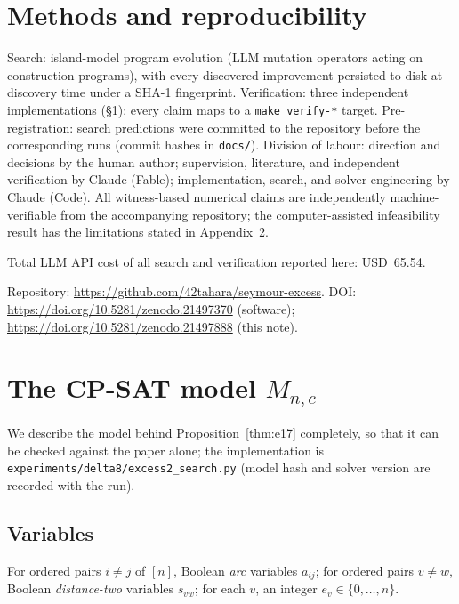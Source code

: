 \documentclass[11pt]{amsart}
\theoremstyle{remark}
\begin{document}
\section{Methods and reproducibility}

Search: island-model program evolution (LLM mutation operators acting on
construction programs), with every discovered improvement persisted to disk
at discovery time under a SHA-1 fingerprint.
Verification: three independent implementations (\S1); every
claim maps to a \texttt{make verify-*} target. Pre-registration: search
predictions were committed to the repository before the corresponding runs
(commit hashes in \texttt{docs/}). Division of labour: direction and
decisions by the human author; supervision, literature, and independent
verification by Claude (Fable); implementation, search, and solver
engineering by Claude (Code). All witness-based numerical claims are
independently machine-verifiable from the accompanying repository; the
computer-assisted infeasibility result has the limitations stated in
Appendix~\ref{app:model}.

Total LLM API cost of all search and verification reported here:
USD~65.54.

Repository: \url{https://github.com/42tahara/seymour-excess}.
DOI: \url{https://doi.org/10.5281/zenodo.21497370} (software);
\url{https://doi.org/10.5281/zenodo.21497888} (this note).


\appendix

\section{The CP-SAT model $M_{n,c}$}\label{app:model}

We describe the model behind Proposition~\ref{thm:e17} completely, so that
it can be checked against the paper alone; the implementation is
\texttt{experiments/delta8/excess2\_search.py} (model hash and solver
version are recorded with the run).

\subsection*{Variables}
For ordered pairs $i \ne j$ of $[n]$, Boolean \emph{arc} variables
$a_{ij}$; for ordered pairs $v \ne w$, Boolean \emph{distance-two}
variables $s_{vw}$; for each $v$, an integer $e_v \in \{0, \dots, n\}$.
\end{document}
